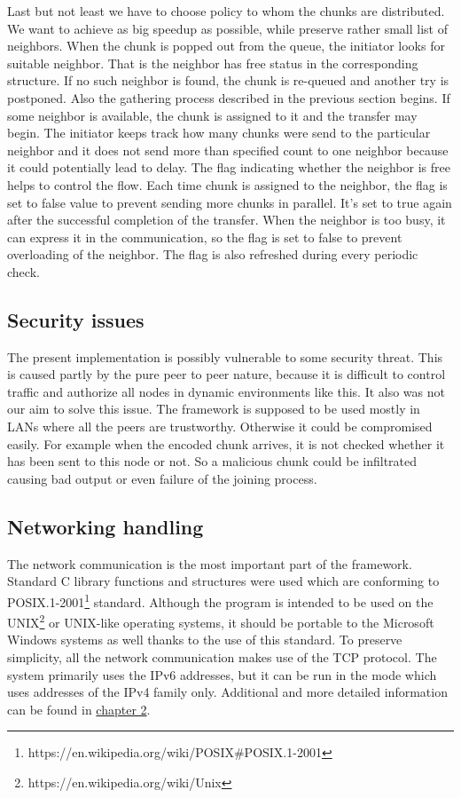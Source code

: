 Last but not least we have to choose policy to whom the chunks are
distributed. We want to achieve as big speedup as possible, while
preserve rather small list of neighbors. When the chunk is popped out
from the queue, the initiator looks for suitable neighbor. That is the
neighbor has free status in the corresponding structure. If no such
neighbor is found, the chunk is re-queued and another try is postponed.
Also the gathering process described in the previous section begins. If
some neighbor is available, the chunk is assigned to it and the transfer
may begin. The initiator keeps track how many chunks were send to the
particular neighbor and it does not send more than specified count to
one neighbor because it could potentially lead to delay. The flag
indicating whether the neighbor is free helps to control the flow. Each
time chunk is assigned to the neighbor, the flag is set to false value
to prevent sending more chunks in parallel. It's set to true again after
the successful completion of the transfer. When the neighbor is too
busy, it can express it in the communication, so the flag is set to
false to prevent overloading of the neighbor. The flag is also refreshed
during every periodic check.

\subsection{Security issues}\label{security-issues}

The present implementation is possibly vulnerable to some security
threat. This is caused partly by the pure peer to peer nature, because
it is difficult to control traffic and authorize all nodes in dynamic
environments like this. It also was not our aim to solve this issue. The
framework is supposed to be used mostly in LANs where all the peers are
trustworthy. Otherwise it could be compromised easily. For example when
the encoded chunk arrives, it is not checked whether it has been sent to
this node or not. So a malicious chunk could be infiltrated causing bad
output or even failure of the joining process.

\subsection{Networking handling}\label{networking-handling}

The network communication is the most important part of the framework.
Standard C library functions and structures were used which are
conforming to
POSIX.1-2001\footnote{https://en.wikipedia.org/wiki/POSIX\#POSIX.1-2001}
standard. Although the program is intended to be used on the
UNIX\footnote{https://en.wikipedia.org/wiki/Unix} or UNIX-like operating
systems, it should be portable to the Microsoft Windows systems as well
thanks to the use of this standard. To preserve simplicity, all the
network communication makes use of the TCP protocol. The system
primarily uses the IPv6 addresses, but it can be run in the mode which
uses addresses of the IPv4 family only. Additional and more detailed
information can be found in \hyperref[implementation]{chapter 2}.

